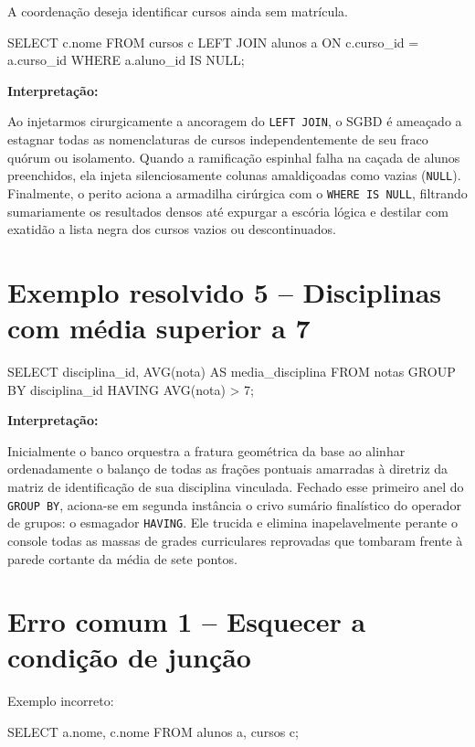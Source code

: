 A coordenação deseja identificar cursos ainda sem matrícula.

\begin{sqlcode}
SELECT c.nome
FROM cursos c
LEFT JOIN alunos a
    ON c.curso_id = a.curso_id
WHERE a.aluno_id IS NULL;
\end{sqlcode}

\textbf{Interpretação:}

Ao injetarmos cirurgicamente a ancoragem do \texttt{LEFT JOIN}, o SGBD é ameaçado a estagnar todas as nomenclaturas de cursos independentemente de seu fraco quórum ou isolamento. Quando a ramificação espinhal falha na caçada de alunos preenchidos, ela injeta silenciosamente colunas amaldiçoadas como vazias (\texttt{NULL}). Finalmente, o perito aciona a armadilha cirúrgica com o \texttt{WHERE IS NULL}, filtrando sumariamente os resultados densos até expurgar a escória lógica e destilar com exatidão a lista negra dos cursos vazios ou descontinuados.

\section{Exemplo resolvido 5 -- Disciplinas com média superior a 7}

\begin{sqlcode}
SELECT
    disciplina_id,
    AVG(nota) AS media_disciplina
FROM notas
GROUP BY disciplina_id
HAVING AVG(nota) > 7;
\end{sqlcode}

\textbf{Interpretação:}

Inicialmente o banco orquestra a fratura geométrica da base ao alinhar ordenadamente o balanço de todas as frações pontuais amarradas à diretriz da matriz de identificação de sua disciplina vinculada. Fechado esse primeiro anel do \texttt{GROUP BY}, aciona-se em segunda instância o crivo sumário finalístico do operador de grupos: o esmagador \texttt{HAVING}. Ele trucida e elimina inapelavelmente perante o console todas as massas de grades curriculares reprovadas que tombaram frente à parede cortante da média de sete pontos.

\section{Erro comum 1 -- Esquecer a condição de junção}

Exemplo incorreto:

\begin{sqlcode}
SELECT a.nome, c.nome
FROM alunos a, cursos c;
\end{sqlcode}

